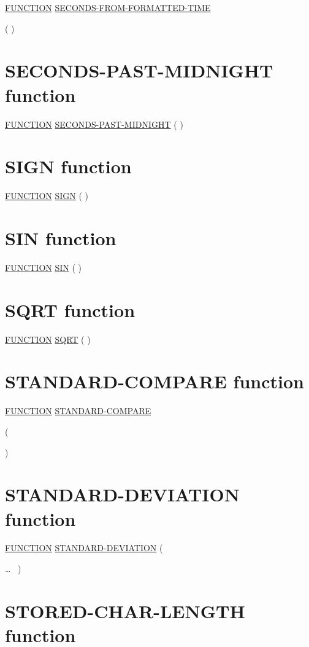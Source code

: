 \documentclass[a4paper,oneside,svgnames]{scrbook}
\makeatletter
\newcommand{\key}[1]{\underline{#1}}
\newcommand{\pending}[1]{%
  \textcolor{gray!75}{#1}}
\newenvironment{0-1}{$\left[ \begin{tabular}{@{}l@{}}}{\end{tabular} \right]$}
\newenvironment{1=}{$\left\{ \begin{tabular}{@{}l@{}}}{\end{tabular} \right\}$}
\makeatother
\begin{document}
\key{FUNCTION} \key{SECONDS-FROM-FORMATTED-TIME}

( \argument \argument)

\section{SECONDS-PAST-MIDNIGHT function}

\key{FUNCTION} \key{SECONDS-PAST-MIDNIGHT} ( \argument )

\section{SIGN function}

\key{FUNCTION} \key{SIGN} ( \argument )

\section{SIN function}

\key{FUNCTION} \key{SIN} ( \argument )

\section{SQRT function}

\key{FUNCTION} \key{SQRT} ( \argument )

\section{STANDARD-COMPARE function}

\pending{
  \key{FUNCTION} \key{STANDARD-COMPARE}
}

\pending{
  ( \argument \argument
  \begin{0-1}
    \argument
  \end{0-1}
  \begin{0-1}
    \argument
  \end{0-1}
  )
}

\section{STANDARD-DEVIATION function}

\key{FUNCTION} \key{STANDARD-DEVIATION} (
\begin{1=}
  \argument
\end{1=}\ldots
\ {})

\section{STORED-CHAR-LENGTH function}
\end{document}
